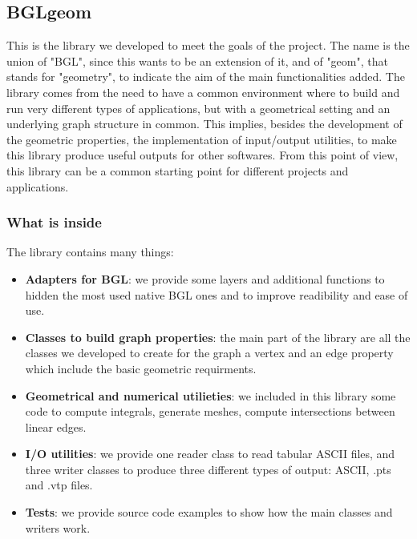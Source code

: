 \documentclass[11pt]{article} %
\begin{document}
	\subsection{BGLgeom}
	This is the library we developed to meet the goals of the project. The name is the union of "BGL", since this wants to be an extension of it, and of "geom", that stands for "geometry", to indicate the aim of the main functionalities added. 
	\newline\newline
	The library comes from the need to have a common environment where to build and run very different types of applications, but with a geometrical setting and an underlying graph structure in common. This implies, besides the development of the geometric properties, the implementation of input/output utilities, to make this library produce useful outputs for other softwares. From this point of view, this library can be a common starting point for different projects and applications.
	\newline\newline	
	
		\subsubsection{What is inside}
		The library contains many things:
		\begin{itemize}
			\item \textbf{Adapters for BGL}: we provide some layers and additional functions to hidden the most used native BGL ones and to improve readibility and ease of use.
			\item \textbf{Classes to build graph properties}: the main part of the library are all the classes we developed to create for the graph a vertex and an edge property which include the basic geometric requirments.
			\item \textbf{Geometrical and numerical utilieties}: we included in this library some code to compute integrals, generate meshes, compute intersections between linear edges.
			\item \textbf{I/O utilities}: we provide one reader class to read tabular ASCII files, and three writer classes to produce three different types of output: ASCII, .pts and .vtp files.
			\item \textbf{Tests}: we provide source code examples to show how the main classes and writers work.
		\end{itemize}
	
\end{document}
